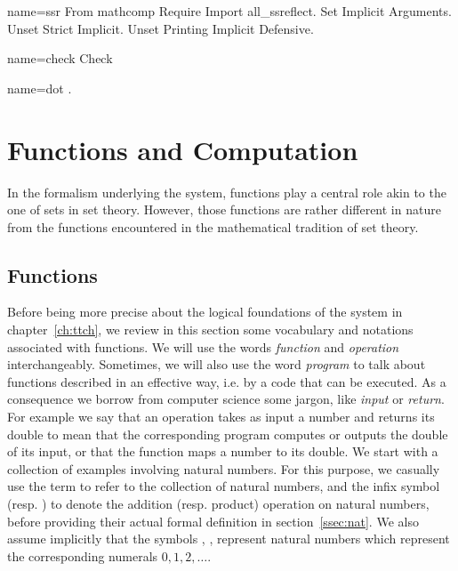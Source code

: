 \begin{coqdef}{name=ssr}
 From mathcomp Require Import all_ssreflect.
 Set Implicit Arguments.
 Unset Strict Implicit.
 Unset Printing Implicit Defensive.
\end{coqdef}
\begin{coqdef}{name=check}
Check
\end{coqdef}
\begin{coqdef}{name=dot}
.
\end{coqdef}

\chapter{Functions and Computation}\label{ch:prog}

In the formalism underlying the \Coq{} system, functions play a
central role akin to the one of sets in set theory. However,
those functions are rather different in nature from the
functions encountered in the mathematical tradition of set theory.

\section{Functions}\label{sec:functions}
 Before being more
precise about the logical foundations of the \Coq{} system in
chapter~\ref{ch:ttch},
we review in this section some vocabulary and notations associated
with functions.
We will use the words \emph{function} and \emph{operation}
interchangeably. Sometimes, we will also use the word \emph{program}
to talk about functions described in an effective way, i.e. by a code
that can be executed. As a consequence we borrow from computer science
some jargon, like \emph{input} or \emph{return}. For example we say that
an operation takes as input a number and returns its double to mean
that the corresponding program computes or outputs the double of its
input, or that the function maps a number to its double. We start with
a collection of examples involving natural numbers. For this purpose,
we casually use the \Coq{} term  to refer to the collection of natural
numbers, and the infix symbol  \C{+} (resp. \C{*}) to denote the  addition
(resp. product) operation on natural numbers, before providing their
actual formal definition in section~\ref{ssec:nat}. We also
assume implicitly that the \Coq{} symbols  , , 
represent natural numbers which represent the corresponding numerals
$0, 1, 2, \dots$.


